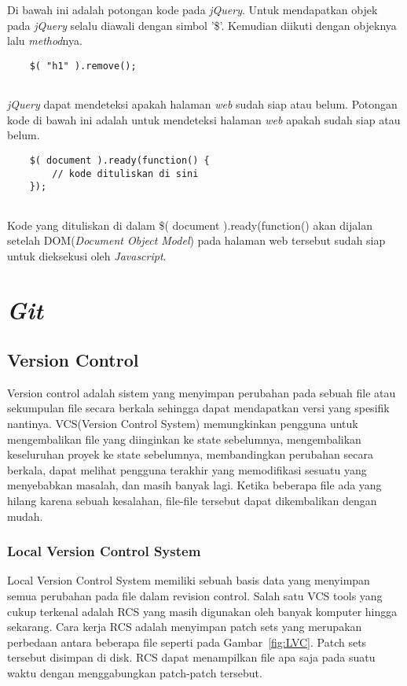 Di bawah ini adalah potongan kode pada \textit{jQuery}. Untuk mendapatkan objek pada \textit{jQuery} selalu diawali dengan simbol '\$'. Kemudian diikuti dengan objeknya lalu \textit{method}nya. 

\begin{lstlisting}
	$( "h1" ).remove();
	
\end{lstlisting}

\textit{jQuery} dapat mendeteksi apakah halaman \textit{web} sudah siap atau belum. Potongan kode di bawah ini adalah untuk mendeteksi halaman \textit{web} apakah sudah siap atau belum.

\begin{lstlisting}
	$( document ).ready(function() {
    	// kode dituliskan di sini
	});
	
\end{lstlisting}

Kode yang dituliskan di dalam \$( document ).ready(function() akan dijalan setelah DOM(\textit{Document Object Model}) pada halaman web tersebut sudah siap untuk dieksekusi oleh \textit{Javascript}. 

\section{\textit{Git}}
\label{sec:Git}

\subsection{Version Control}
Version control adalah sistem yang menyimpan perubahan pada sebuah file atau sekumpulan file secara berkala sehingga dapat mendapatkan versi yang spesifik nantinya. VCS(Version Control System) memungkinkan pengguna untuk mengembalikan file yang diinginkan ke state sebelumnya, mengembalikan keseluruhan proyek ke state sebelumnya, membandingkan perubahan secara berkala, dapat melihat pengguna terakhir yang memodifikasi sesuatu yang menyebabkan masalah, dan masih banyak lagi. Ketika beberapa file ada yang hilang karena sebuah kesalahan, file-file tersebut dapat dikembalikan dengan mudah. 

\subsubsection{Local Version Control System}
Local Version Control System memiliki sebuah basis data yang menyimpan semua perubahan pada file dalam revision control. Salah satu VCS tools yang cukup terkenal adalah RCS yang masih digunakan oleh banyak komputer hingga sekarang. Cara kerja RCS adalah menyimpan patch sets yang merupakan perbedaan antara beberapa file seperti pada Gambar~\ref{fig:LVC}. Patch sets tersebut disimpan di disk. RCS dapat menampilkan file apa saja pada suatu waktu dengan menggabungkan patch-patch tersebut.  

